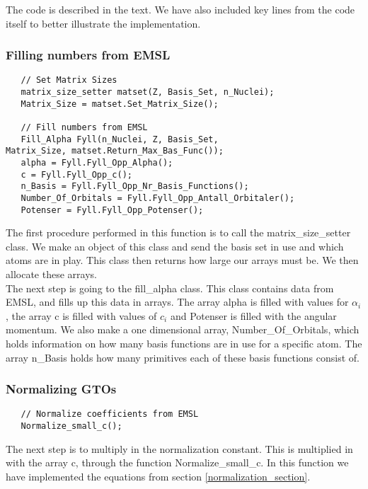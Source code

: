 The code is described in the text. We have also included key lines from the code itself to better illustrate the implementation. \\

\subsubsection{Filling numbers from EMSL}
\begin{lstlisting}
   // Set Matrix Sizes
   matrix_size_setter matset(Z, Basis_Set, n_Nuclei);
   Matrix_Size = matset.Set_Matrix_Size();

   // Fill numbers from EMSL
   Fill_Alpha Fyll(n_Nuclei, Z, Basis_Set,
Matrix_Size, matset.Return_Max_Bas_Func());
   alpha = Fyll.Fyll_Opp_Alpha();
   c = Fyll.Fyll_Opp_c();
   n_Basis = Fyll.Fyll_Opp_Nr_Basis_Functions();
   Number_Of_Orbitals = Fyll.Fyll_Opp_Antall_Orbitaler();
   Potenser = Fyll.Fyll_Opp_Potenser();
\end{lstlisting}

The first procedure performed in this function is to call the matrix\_size\_setter class. We make an object of this class and send the basis set in use and which atoms are in play. This class then returns how large our arrays must be. We then allocate these arrays. \\

The next step is going to the fill\_alpha class. This class contains data from EMSL, and fills up this data in arrays. The array alpha is filled with values for $\alpha_i$, the array c is filled with values of $c_i$ and Potenser is filled with the angular momentum. We also make a one dimensional array, Number\_Of\_Orbitals, which holds information on how many basis functions are in use for a specific atom. The array n\_Basis holds how many primitives each of these basis functions consist of. \\

\subsubsection{Normalizing GTOs}
\begin{lstlisting}
   // Normalize coefficients from EMSL
   Normalize_small_c();
\end{lstlisting}

The next step is to multiply in the normalization constant. This is multiplied in with the array c, through the function Normalize\_small\_c. In this function we have implemented the equations from section \ref{normalization_section}. \\

